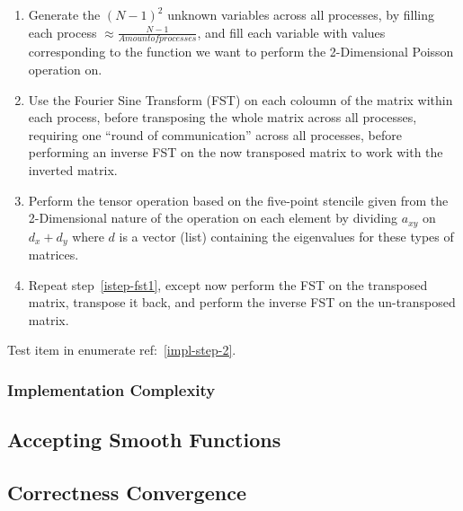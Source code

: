 \documentclass[fontsize=11pt,paper=a4,titlepage]{article}
\begin{document}
\begin{enumerate}
	\item \label{istep-gen} Generate the $(N - 1)^2$ unknown variables across
	all processes, by filling each process $\approx \frac{N-1}{Amount of
	processes}$, and fill each variable with values corresponding to the
	function we want to perform the 2-Dimensional Poisson operation on.

	\item \label{istep-fst1} Use the Fourier Sine Transform (FST) on each
	coloumn of the matrix within each process, before transposing the whole
	matrix across all processes, requiring one ``round of communication'' across
	all processes, before performing an inverse FST on the now transposed matrix
	to work with the inverted matrix.


	\item \label{istep-tens} Perform the tensor operation based on the
	five-point stencile given from the 2-Dimensional nature of the operation on
	each element by dividing $a_{xy}$ on $d_x + d_y$ where $d$ is a vector
	(list) containing the eigenvalues for these types of matrices.

	\item \label{istep-fst2} Repeat step~\ref{istep-fst1}, except now perform
	the FST on the transposed matrix, transpose it back, and perform the inverse
	FST on the un-transposed matrix.

\end{enumerate}

Test item in enumerate ref:~\ref{impl-step-2}.

\subsubsection{Implementation Complexity}


\subsection{Accepting Smooth Functions}

\subsection{Correctness Convergence}

\end{document}
